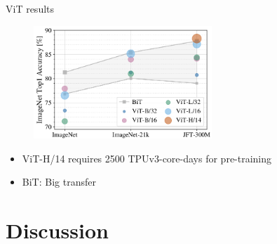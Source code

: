 \documentclass[xcolor=pdftex,dvipsnames,table,mathserif]{beamer}
\begin{document}



\begin{frame}{ViT results}

\begin{figure}[ht]
  \centering
  \includegraphics[width=0.6\textwidth]{vit_graph}
\end{figure}


\begin{itemize}
  \item ViT-H/14 requires 2500 TPUv3-core-days for pre-training
  \item BiT: Big transfer~\cite{kolesnikov_big_2020}
\end{itemize}

\end{frame}



\section{Discussion}
\end{document}
